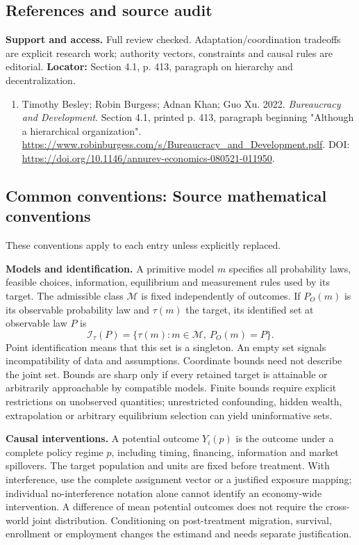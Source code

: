\documentclass[11pt,a4paper]{article}
\begin{document}
\subsection*{References and source audit}
\textbf{Support and access.} Full review checked. Adaptation/coordination tradeoffs are explicit research work; authority vectors, constraints and causal rules are editorial. \textbf{Locator:} Section 4.1, p. 413, paragraph on hierarchy and decentralization.
\begin{enumerate}\raggedright
\item\hypertarget{definitions:source:30007668:1}{} Timothy Besley; Robin Burgess; Adnan Khan; Guo Xu. 2022. \emph{Bureaucracy and Development}. Section 4.1, printed p. 413, paragraph beginning "Although a hierarchical organization".
\url{https://www.robinburgess.com/s/Bureaucracy_and_Development.pdf}.
DOI: \url{https://doi.org/10.1146/annurev-economics-080521-011950}.
\end{enumerate}

\subsection*{Common conventions: Source mathematical conventions}

These conventions apply to each entry unless explicitly replaced.

\textbf{Models and identification.} A primitive model \(m\) specifies all probability laws, feasible choices, information, equilibrium and measurement rules used by its target. The admissible class \(\mathcal M\) is fixed independently of outcomes. If \(P_O(m)\) is its observable probability law and \(\tau(m)\) the target, its identified set at observable law \(P\) is
\[
 \mathcal I_\tau(P)=\{\tau(m):m\in\mathcal M,\ P_O(m)=P\}.
\]
Point identification means that this set is a singleton. An empty set signals incompatibility of data and assumptions. Coordinate bounds need not describe the joint set. Bounds are sharp only if every retained target is attainable or arbitrarily approachable by compatible models. Finite bounds require explicit restrictions on unobserved quantities; unrestricted confounding, hidden wealth, extrapolation or arbitrary equilibrium selection can yield uninformative sets.

\textbf{Causal interventions.} A potential outcome \(Y_i(p)\) is the outcome under a complete policy regime \(p\), including timing, financing, information and market spillovers. The target population and units are fixed before treatment. With interference, use the complete assignment vector or a justified exposure mapping; individual no-interference notation alone cannot identify an economy-wide intervention. A difference of mean potential outcomes does not require the cross-world joint distribution. Conditioning on post-treatment migration, survival, enrollment or employment changes the estimand and needs separate justification.
\end{document}
